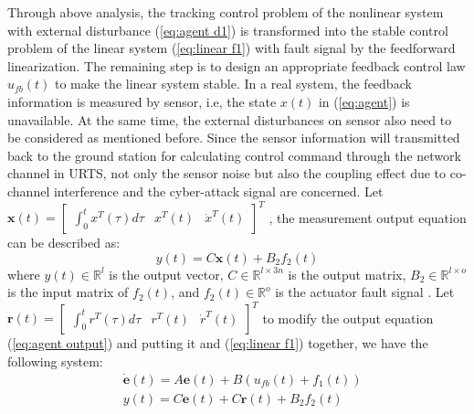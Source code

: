 \documentclass{ieeeaccess}
\begin{document}
Through above analysis, the tracking control problem of the nonlinear system with external disturbance (\ref{eq:agent d1}) is transformed into the stable control problem of the linear system (\ref{eq:linear f1}) with fault signal by the feedforward linearization. The remaining step is to design an appropriate feedback control law $u_{fb}(t)$ to make the linear system stable. In a real system, the feedback information is measured by sensor, i.e, the state $x(t)$ in (\ref{eq:agent}) is unavailable. At the same time, the external disturbances on sensor also need to be considered as mentioned before. Since the sensor information will transmitted back to the ground station for calculating control command through the network channel in URTS, not only the sensor noise but also the coupling effect due to co-channel interference and the cyber-attack signal are concerned. Let $\pmb{x}(t)=\begin{bmatrix}
    \int_{0}^{t}x^T(\tau)d\tau & x^T(t) & \dot{x}^T(t)
\end{bmatrix}^T$
, the measurement output equation can be described as:
\begin{equation} \label{eq:agent output}
    y(t) = C\pmb{x}(t) + B_2f_2(t)
\end{equation}
where $y(t)\in\mathbb{R}^{l}$ is the output vector, $C\in\mathbb{R}^{l\times 3n}$ is the output matrix, $B_2\in\mathbb{R}^{l\times o}$ is the input matrix of $f_2(t)$, and $f_2(t)\in\mathbb{R}^o$ is the actuator fault signal . Let $\pmb{r}(t)=\begin{bmatrix}
    \int_{0}^{t}r^T(\tau)d\tau & r^T(t) & \dot{r}^T(t)
\end{bmatrix}^T$ to modify the output equation (\ref{eq:agent output}) and putting it and (\ref{eq:linear f1}) together, we have the following system:
\begin{equation} \label{eq:error}
    \begin{split}
        & \dot{\pmb{e}}(t)=A\pmb{e}(t)+B(u_{fb}(t)+f_1(t)) \\
        & y(t) = C\pmb{e}(t) + C\pmb{r}(t) + B_2f_2(t)   
    \end{split}  
\end{equation}
\end{document}
